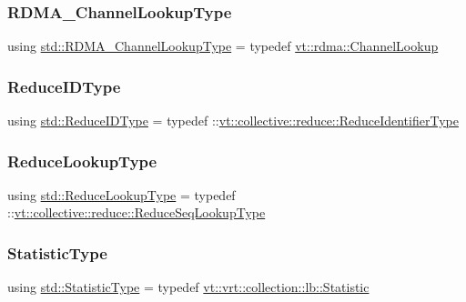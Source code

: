 \mbox{\label{namespacestd_a30c426bd959ae4c3814e36d01efe9df7}} 
\subsubsection{\texorpdfstring{R\+D\+M\+A\+\_\+\+Channel\+Lookup\+Type}{RDMA\_ChannelLookupType}}
{\footnotesize\ttfamily using \hyperlink{namespacestd_a30c426bd959ae4c3814e36d01efe9df7}{std\+::\+R\+D\+M\+A\+\_\+\+Channel\+Lookup\+Type} = typedef \hyperlink{structvt_1_1rdma_1_1_channel_lookup}{vt\+::rdma\+::\+Channel\+Lookup}}

\mbox{\label{namespacestd_a499b9bfc09049e7ac355a623c6e3c357}} 
\subsubsection{\texorpdfstring{Reduce\+I\+D\+Type}{ReduceIDType}}
{\footnotesize\ttfamily using \hyperlink{namespacestd_a499b9bfc09049e7ac355a623c6e3c357}{std\+::\+Reduce\+I\+D\+Type} = typedef \+::\hyperlink{namespacevt_1_1collective_1_1reduce_ad688d164ad18b2011198cbc97cc84b74}{vt\+::collective\+::reduce\+::\+Reduce\+Identifier\+Type}}

\mbox{\label{namespacestd_ac07dcbf55c02624fc69badeb378edb40}} 
\subsubsection{\texorpdfstring{Reduce\+Lookup\+Type}{ReduceLookupType}}
{\footnotesize\ttfamily using \hyperlink{namespacestd_ac07dcbf55c02624fc69badeb378edb40}{std\+::\+Reduce\+Lookup\+Type} = typedef \+::\hyperlink{namespacevt_1_1collective_1_1reduce_a3e69dddbbc89a0c9e9b986c5642efeba}{vt\+::collective\+::reduce\+::\+Reduce\+Seq\+Lookup\+Type}}

\mbox{\label{namespacestd_a77b0310083adc8639f9659f5c8b3cf0d}} 
\subsubsection{\texorpdfstring{Statistic\+Type}{StatisticType}}
{\footnotesize\ttfamily using \hyperlink{namespacevt_1_1vrt_1_1collection_1_1lb_af0e20ef9afee77295053aa83bf1348b1}{std\+::\+Statistic\+Type} = typedef \hyperlink{namespacevt_1_1vrt_1_1collection_1_1lb_af0e20ef9afee77295053aa83bf1348b1}{vt\+::vrt\+::collection\+::lb\+::\+Statistic}}

